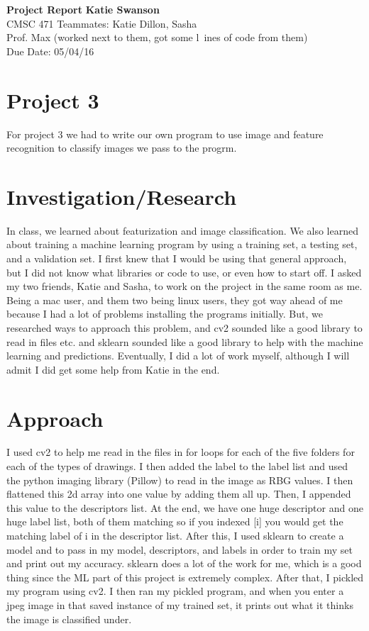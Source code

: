 \documentclass[a4paper, 11pt]{article}
\begin{document}
\noindent
\large\textbf{Project Report} \hfill \textbf{Katie Swanson} \\
\normalsize CMSC 471 \hfill Teammates: Katie Dillon, Sasha \\
Prof. Max \hfill (worked next to them, got some l\
ines of code from them) \\
 \hfill Due Date: 05/04/16

\section*{Project 3}
For project 3 we had to write our own program to use image and feature recognition to classify images we pass to the progrm.

\section*{Investigation/Research}
In class, we learned about featurization and image classification. We also learned about training a machine learning program by using a training set, a testing set, and a validation set. I first knew that I would be using that general approach, but I did not know what libraries or code to use, or even how to start off. I asked my two friends, Katie and Sasha, to work on the project in the same room as me. Being a mac user, and them two being linux users, they got way ahead of me because I had a lot of problems installing the programs initially. But, we researched ways to approach this problem, and cv2 sounded like a good library to read in files etc. and sklearn sounded like a good library to help with the machine learning and predictions. Eventually, I did a lot of work myself, although I will admit I did get some help from Katie in the end.

\section*{Approach}
I used cv2 to help me read in the files in for loops for each of the five folders for each of the types of drawings. I then added the label to the label list and used the python imaging library (Pillow) to read in the image as RBG values. I then flattened this 2d array into one value by adding them all up. Then, I appended this value to the descriptors list. At the end, we have one huge descriptor and one huge label list, both of them matching so if you indexed [i] you would get the matching label of i in the descriptor list. After this, I used sklearn to create a model and to pass in my model, descriptors, and labels in order to train my set and print out my accuracy. sklearn does a lot of the work for me, which is a good thing since the ML part of this project is extremely complex. After that, I pickled my program using cv2. I then ran my pickled program, and when you enter a jpeg image in that saved instance of my trained set, it prints out what it thinks the image is classified under.
\end{document}
